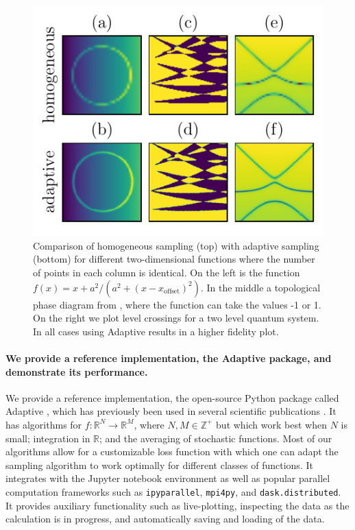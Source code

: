 \begin{figure}
\hypertarget{fig:Learner2D}{%
\centering
\includegraphics{chapter_adaptive/figures/Learner2D.pdf}
\caption{Comparison of homogeneous sampling (top) with adaptive sampling (bottom) for different two-dimensional functions where the number of points in each column is identical.
On the left is the function $f(x) = x + a ^ 2 / (a ^ 2 + (x - x_\textrm{offset}) ^ 2)$.
In the middle a topological phase diagram from \cite{Nijholt2016}, where the function can take the values -1 or 1.
On the right we plot level crossings for a two level quantum system.
In all cases using Adaptive results in a higher fidelity plot.}\label{fig:Learner2D}
}
\end{figure}

\hypertarget{we-provide-a-reference-implementation-the-adaptive-package-and-demonstrate-its-performance.}{%
\paragraph{We provide a reference implementation, the Adaptive package, and demonstrate its performance.}\label{we-provide-a-reference-implementation-the-adaptive-package-and-demonstrate-its-performance.}}

We provide a reference implementation, the open-source Python package called Adaptive \cite{Nijholt2019}, which has previously been used in several scientific publications \cite{Vuik2018, Laeven2019, Bommer2019, Melo2019}.
It has algorithms for $f \colon \mathbb{R}^N \to \mathbb{R}^M$, where $N, M \in \mathbb{Z}^+$ but which work best when $N$ is small; integration in $\mathbb{R}$; and the averaging of stochastic functions.
Most of our algorithms allow for a customizable loss function with which one can adapt the sampling algorithm to work optimally for different classes of functions.
It integrates with the Jupyter notebook environment as well as popular parallel computation frameworks such as \passthrough{\lstinline!ipyparallel!}, \passthrough{\lstinline!mpi4py!}, and \passthrough{\lstinline!dask.distributed!}.
It provides auxiliary functionality such as live-plotting, inspecting the data as the calculation is in progress, and automatically saving and loading of the data.

